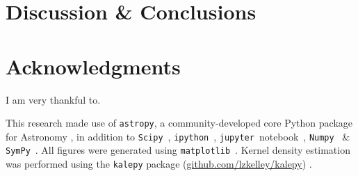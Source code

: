 




\section{Discussion \& Conclusions}
    \label{sec:disc}







\section*{Acknowledgments}
	I am very thankful to.

    This research made use of \texttt{astropy}, a community-developed core Python package for Astronomy \citep{astropy2013}, in addition to \texttt{Scipy}~\citep{scipy}, \texttt{ipython}~\citep{ipython}, \texttt{jupyter}~notebook~\citep{jupyter}, \texttt{Numpy}~\citep{numpy2011} \& \texttt{SymPy}~\citep{sympy2017}.  All figures were generated using \texttt{matplotlib}~\citep{matplotlib2007}.  Kernel density estimation was performed using the \texttt{kalepy}{} package (\href{https://github.com/lzkelley/kalepy}{github.com/lzkelley/kalepy}) \citep{kalepy2021}.

